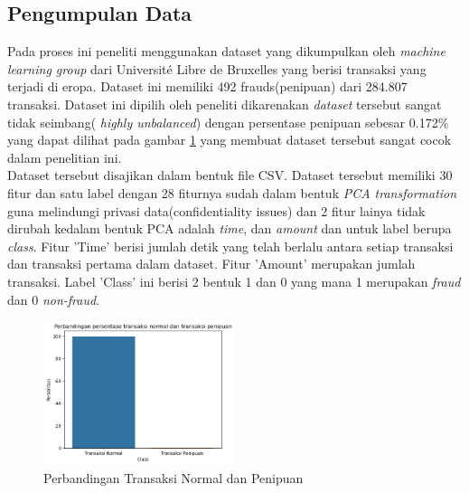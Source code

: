 \subsection{Pengumpulan Data} \label{III.pengumpulandata}
Pada proses ini peneliti menggunakan dataset yang dikumpulkan oleh \textit{machine learning group} dari Université Libre de Bruxelles\cite{WinNT,leborgne2022fraud} yang berisi transaksi yang terjadi di eropa. Dataset ini memiliki 492 frauds(penipuan) dari 284.807 transaksi. Dataset ini dipilih oleh peneliti dikarenakan \textit{dataset} tersebut sangat tidak seimbang(\textit{ highly unbalanced}) dengan persentase penipuan sebesar 0.172\% yang dapat dilihat pada gambar \ref{fig:3.Perbandingan Transaksi Normal dan Penipuan} yang membuat dataset tersebut sangat cocok dalam penelitian ini.\\
Dataset tersebut disajikan dalam bentuk file CSV. Dataset tersebut memiliki 30 fitur dan satu label dengan 28 fiturnya sudah dalam bentuk \textit{PCA transformation} guna melindungi privasi data(confidentiality issues) dan 2 fitur lainya tidak dirubah kedalam bentuk PCA adalah \textit{time}, dan \textit{amount} dan untuk label berupa \textit{class}. Fitur 'Time' berisi jumlah detik yang telah berlalu antara setiap transaksi dan transaksi pertama dalam dataset. Fitur 'Amount' merupakan jumlah transaksi. Label 'Class' ini berisi 2 bentuk 1 dan 0 yang mana 1 merupakan \textit{fraud} dan 0 \textit{non-fraud}.
\begin{figure}[H]
	\centering
	\includegraphics[width=0.5\textwidth]{figure/perbandinganpersentasenormalpenipuan.png}
	\caption{Perbandingan Transaksi Normal dan Penipuan}
	\label{fig:3.Perbandingan Transaksi Normal dan Penipuan}
\end{figure}

